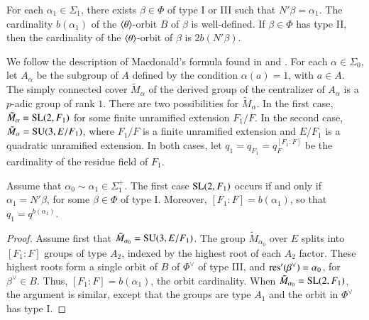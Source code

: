 For each $\alpha_1\in\Sigma_1$, there exists $\beta\in\Phi$ of
type I or III such that $N'\beta = \alpha_1$.  The cardinality $b(\alpha_1)$
of the $\langle{\theta}\rangle$-orbit $B$ of $\beta$ is well-defined.  If $\beta\in\Phi$ has type II,
then the cardinality of the $\langle{\theta}\rangle$-orbit of $\beta$ is $2b(N'\beta)$.

We follow the description of Macdonald's formula 
found in \cite{casselman1980unramified} and \cite{casselman2005companion}.
For each $\alpha\in \Sigma_0$, let $A_{\alpha}$ be the subgroup of $A$ defined by the condition $\alpha(a)=1$, with $a\in A$.
The simply connected cover $\tilde M_\alpha$ of the derived group of the centralizer of $A_\alpha$ is a $p$-adic
group of rank $1$.  There are two possibilities for $\tilde M_\alpha$.  In the first case, $\tilde M_\alpha = {\operatorname{SL}}(2,F_1)$ for
some finite unramified extension $F_1/F$.  In the second case, $\tilde M_\alpha = {\operatorname{SU}}(3,E/F_1)$, where $F_1/F$ is 
a finite unramified extension and $E/F_1$ is a quadratic unramified extension.  In both cases, 
let $q_1 = q_{F_1} = q_F^{[F_1:F]}$ be the cardinality
of the residue field of $F_1$.


\begin{lemma}
Assume that $\alpha_0\sim\alpha_1\in\Sigma^+_1$.  
The first case ${\operatorname{SL}}(2,F_1)$ occurs if and only if $\alpha_1=N'\beta$, for some $\beta\in\Phi$ of type I.
Moreover, $[F_1:F] = b(\alpha_1)$, so that $q_1 = q^{b(\alpha_1)}$.
\end{lemma}

\begin{proof}  
Assume first that $\tilde M_{\alpha_0} = {\operatorname{SU}}(3,E/F_1)$.
The group $\tilde M_{\alpha_0}$ over $E$ splits into $[F_1:F]$ groups of type $A_2$, indexed by the highest root
of each $A_2$ factor.  These highest roots form a single orbit of $B$ of $\Phi^\vee$ of type III, and ${\operatorname{res}}'(\beta^\vee)=\alpha_0$,
for $\beta^\vee\in B$.  Thus, $[F_1:F]= b(\alpha_1)$, the orbit cardinality.
When $\tilde M_{\alpha_0} = {\operatorname{SL}}(2,F_1)$, the argument is similar, except that the groups are type $A_1$ and the orbit in $\Phi^\vee$
has type I.  %
\end{proof}

